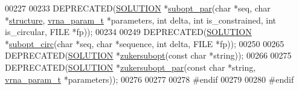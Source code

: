 \begin{DoxyCode}
00227 
00233 DEPRECATED(\hyperlink{structvrna__subopt__sol__s}{SOLUTION} *\hyperlink{group__subopt__wuchty_gaa1e1e7031a948ebcb39a9d58d1e9842c}{subopt\_par}(\textcolor{keywordtype}{char} *seq, \textcolor{keywordtype}{char} *\hyperlink{structvrna__subopt__sol__s_a3c632c7f08eb6a8827c6151625e5ef8e}{structure}, 
      \hyperlink{group__energy__parameters_structvrna__param__s}{vrna\_param\_t} *parameters, \textcolor{keywordtype}{int} delta, \textcolor{keywordtype}{int} is\_constrained, \textcolor{keywordtype}{int} is\_circular, FILE *fp));
00234 
00249 DEPRECATED(\hyperlink{structvrna__subopt__sol__s}{SOLUTION} *\hyperlink{group__subopt__wuchty_ga8634516e4740e0b6c9a46d2bae940340}{subopt\_circ}(\textcolor{keywordtype}{char} *seq, \textcolor{keywordtype}{char} *sequence, \textcolor{keywordtype}{int} delta, FILE *fp));
00250 
00265 DEPRECATED(\hyperlink{structvrna__subopt__sol__s}{SOLUTION}  *\hyperlink{group__subopt__zuker_ga0d5104e3ecf119d8eabd40aa5fe47f90}{zukersubopt}(\textcolor{keyword}{const} \textcolor{keywordtype}{char} *\textcolor{keywordtype}{string}));
00266 
00275 DEPRECATED(\hyperlink{structvrna__subopt__sol__s}{SOLUTION}  *\hyperlink{group__subopt__zuker_gab6d0ea8cc1d02f6dd831ca81043c9eb8}{zukersubopt\_par}(\textcolor{keyword}{const} \textcolor{keywordtype}{char} *\textcolor{keywordtype}{string}, 
      \hyperlink{group__energy__parameters_structvrna__param__s}{vrna\_param\_t} *parameters));
00276 
00277 
00278 \textcolor{preprocessor}{#endif}
00279 
00280 \textcolor{preprocessor}{#endif}
\end{DoxyCode}
